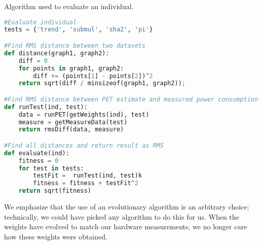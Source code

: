 \begin{algorithm}
\caption{Algorithm used to evaluate an individual.}
\label{lst:ga-eval-algorithm}
\begin{lstlisting}[language=python,style=algo]
#Evaluate individual
tests = {'trend', 'submul', 'sha2', 'pi'}

#Find RMS distance between two datasets
def distance(graph1, graph2):
    diff = 0
    for points in graph1, graph2:
        diff += (points[1] - points[2])^2
    return sqrt(diff / minsizeof(graph1, graph2));

#Find RMS distance between PET estimate and measured power consumption
def runTest(ind, test):
    data = runPET(getWeights(ind), test)
    measure = getMeasureData(test)
    return rmsDiff(data, measure)

#Find all distances and return result as RMS
def evaluate(ind):
    fitness = 0
    for test in tests:
        testFit =  runTest(ind, test)k
        fitness = fitness + testFit^2
    return sqrt(fitness)
\end{lstlisting}
\end{algorithm}




We emphasize that the use of an evolutionary algorithm is an arbitrary choice;
technically, we could have picked any algorithm to do this for us. When the
weights have evolved to match our hardware measurements, we no longer care how
these weights were obtained.
